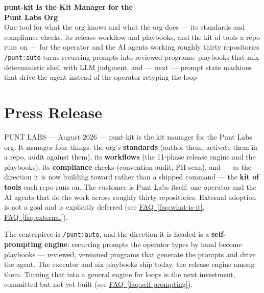 \documentclass[11pt,letterpaper]{article}
\newcommand{\faqref}[1]{\hyperref[#1]{FAQ~\ref*{#1}}}
\begin{document}
\begin{center}
  {\LARGE\bfseries\color{SectionBlue}
  punt-kit Is the Kit Manager for the\\Punt Labs Org} \\[0.8em]
  {\large\color{AccentGray}
  One tool for what the org knows and what the org does --- its standards and
  compliance checks, its release workflow and playbooks, and the kit of tools
  a repo runs on --- for the operator and the AI agents working roughly thirty
  repositories} \\[0.3em]
  {\large\color{AccentGray}
  \texttt{/punt:auto} turns recurring prompts into reviewed programs:
  playbooks that mix deterministic shell with LLM judgment, and --- next ---
  prompt state machines that drive the agent instead of the operator
  retyping the loop}
\end{center}

\vspace{0.5em}


\section*{Press Release}

PUNT LABS --- August 2026 --- punt-kit is the kit manager for the Punt Labs
org. It manages four things: the org's \textbf{standards} (author them,
activate them in a repo, audit against them), its \textbf{workflows} (the
11-phase release engine and the playbooks), its \textbf{compliance} checks
(convention audit, PII scan), and --- as the direction it is now building
toward rather than a shipped command --- the \textbf{kit of tools} each repo
runs on. The customer is Punt Labs itself: one operator and the AI agents that
do the work across roughly thirty repositories. External adoption is not a goal
and is explicitly deferred
(see \faqref{faq:what-is-it}, \faqref{faq:external}).

The centerpiece is \texttt{/punt:auto}, and the direction it is headed is a
\textbf{self-prompting engine}: recurring prompts the operator types by hand
become playbooks --- reviewed, versioned programs that generate the prompts
and drive the agent. The executor and six playbooks ship today, the release
engine among them. Turning that into a general engine for loops is the next
investment, committed but not yet built
(see \faqref{faq:self-prompting}).
\end{document}
